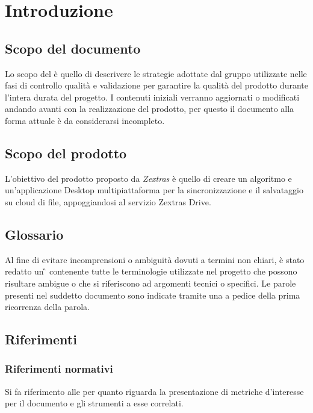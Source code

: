 \section{Introduzione}
\subsection{Scopo del documento}

Lo scopo del  \PdQ{}  è quello di descrivere le strategie adottate dal gruppo \Gruppo{} utilizzate nelle fasi di controllo qualità e validazione per garantire la qualità del prodotto durante l'intera durata del progetto.  I contenuti iniziali verranno aggiornati o modificati andando avanti con la realizzazione del prodotto,  per questo il documento alla forma attuale è da considerarsi incompleto.  

\subsection{Scopo del prodotto}

L'obiettivo del prodotto \progetto{} proposto da \textit{Zextras} è quello di creare un algoritmo e un'applicazione Desktop multipiattaforma per la sincronizzazione e il salvataggio su cloud di file,  appoggiandosi al servizio Zextras Drive.  

\subsection{Glossario}

Al fine di evitare incomprensioni o ambiguità dovuti a termini non chiari,  è stato redatto un \G{} contenente tutte le terminologie utilizzate nel progetto che possono risultare ambigue o che si riferiscono ad argomenti tecnici o specifici.  Le parole presenti nel suddetto documento sono indicate tramite una \glo{} a pedice della prima ricorrenza della parola. 

\subsection{Riferimenti}
\subsubsection{Riferimenti normativi}
Si fa riferimento alle \NdP{} per quanto riguarda la presentazione di metriche d'interesse per il documento e gli strumenti a esse correlati. 
